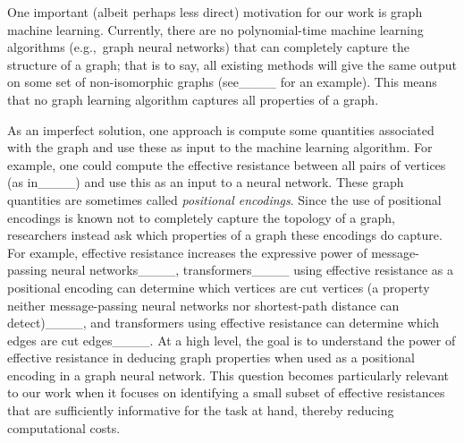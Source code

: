One important (albeit perhaps less direct) motivation for our work is graph machine learning. Currently, there are no polynomial-time machine learning algorithms (e.g.,~graph neural networks) that can completely capture the structure of a graph; that is to say, all existing methods will give the same output on some set of non-isomorphic graphs (see____ for an example). This means that no graph learning algorithm captures all properties of a graph.
\par 
As an imperfect solution, one approach is compute some quantities associated with the graph and use these as input to the machine learning algorithm. For example, one could compute the effective resistance between all pairs of vertices (as in____) and use this as an input to a neural network. These graph quantities are sometimes called \textit{positional encodings}. Since the use of positional encodings is known not to completely capture the topology of a graph, researchers instead ask which properties of a graph these encodings do capture. For example, effective resistance increases the expressive power of message-passing neural networks____, transformers____ using effective resistance as a positional encoding can determine which vertices are cut vertices (a property neither message-passing neural networks nor shortest-path distance can detect)____, and transformers using effective resistance can determine which edges are cut edges____. At a high level, the goal is to understand the power of effective resistance in deducing graph properties when used as a positional encoding in a graph neural network. This question becomes particularly relevant to our work when it focuses on identifying a small subset of effective resistances that are sufficiently informative for the task at hand, thereby reducing computational costs.